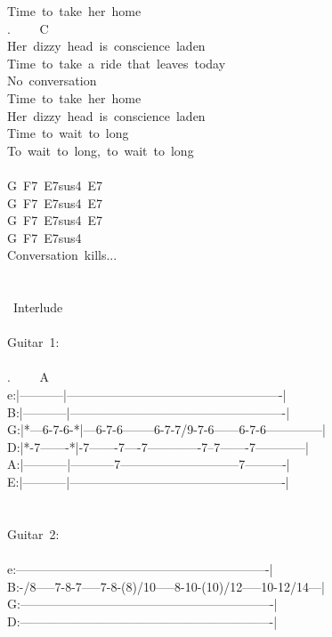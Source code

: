 {Time\ to\ take\ her\ home\\
. \ \ \ \ C\ \ \ \ \ \ \ \ \ \ \ \ \ \ \ \ \ \ \ \ \ \ \ \ \ \ \ \ \ \ \ \\
Her\ dizzy\ head\ is\ conscience\ laden\\
Time\ to\ take\ a\ ride\ that\ leaves\ today\\
No\ conversation\\
Time\ to\ take\ her\ home\\
Her\ dizzy\ head\ is\ conscience\ laden\\
Time\ to\ wait\ to\ long\\
To\ wait\ to\ long,\ to\ wait\ to\ long\\
\\
G\ F7\ E7sus4\ E7\\
G\ F7\ E7sus4\ E7\\
G\ F7\ E7sus4\ E7\\
G\ F7\ E7sus4\\
Conversation\ kills...\\
\\
\\
\lbrack\ Interlude\rbrack\\
\\
Guitar\ 1:\\
\\
. \ \ \ \ A\\
e:|-----------|----------------------------------------------------|\\
B:|-----------|----------------------------------------------------|\\
G:|*---6-7-6-*|---6-7-6--------6-7-7/9-7-6------6-7-6--------------|\\
D:|*-7-------*|-7-------7----7-------------7--7-------7------------|\\
A:|-----------|-----------7-----------------------------7----------|\\
E:|-----------|----------------------------------------------------|\\
\\
\\
Guitar\ 2:\\
\\
e:-------------------------------------------------------------|\\
B:-/8-----7-8-7-----7-8-(8)/10-----8-10-(10)/12-----10-12/14---|\\
G:-------------------------------------------------------------|\\
D:-------------------------------------------------------------|\\
}
